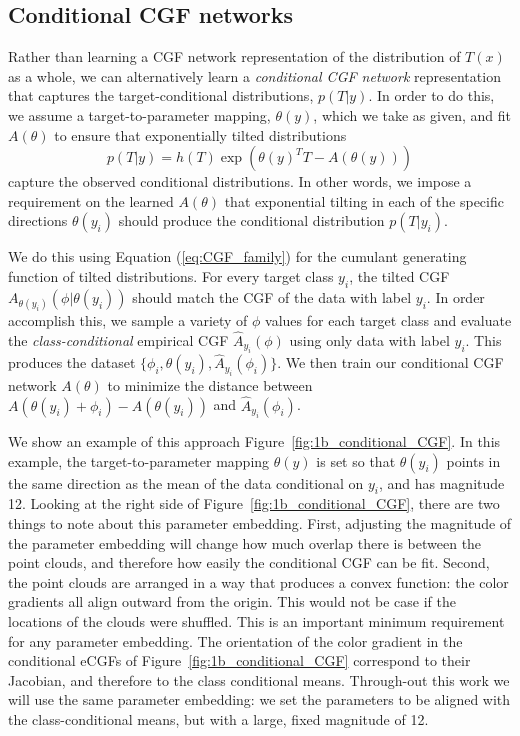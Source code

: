 \documentclass{article}      %
\begin{document}
\subsection{Conditional CGF networks}

Rather than learning a CGF network representation of the distribution of $T(x)$ as a whole, we can alternatively learn a \textit{conditional CGF network} representation that captures the target-conditional distributions, $p(T|y)$.
In order to do this, we assume a target-to-parameter mapping, $\theta(y)$, which we take as given, and fit $A(\theta)$ to ensure that exponentially tilted distributions
\begin{equation}
  p(T|y) = h(T) \exp(\theta(y)^T T - A(\theta(y))) \label{eq:class_conditional}
\end{equation}
capture the observed conditional distributions.
In other words, we impose a requirement on the learned $A(\theta)$ that exponential tilting in each of the specific directions $\theta(y_i)$ should produce the conditional distribution $p(T|y_i)$.

We do this using Equation (\ref{eq:CGF_family}) for the cumulant generating function of tilted distributions.
For every target class $y_i$, the tilted CGF $A_{\theta(y_i)}(\phi | \theta(y_i))$ should match the CGF of the data with label $y_i$.
In order accomplish this, we sample a variety of $\phi$ values for each target class and evaluate the \textit{class-conditional} empirical CGF $\hat A_{y_i}(\phi)$ using only data with label $y_i$.
This produces the dataset $\{\phi_{i}, \theta(y_i), \hat A_{y_i}(\phi_i)\}$.
We then train our conditional CGF network $A(\theta)$ to minimize the distance between ${A(\theta(y_i) + \phi_i ) - A(\theta(y_i))}$ and $\hat A_{y_i}(\phi_i)$.

We show an example of this approach Figure~\ref{fig:1b_conditional_CGF}.
In this example, the target-to-parameter mapping $\theta(y)$ is set so that $\theta(y_i)$ points in the same direction as the mean of the data conditional on $y_i$, and has magnitude 12.
Looking at the right side of Figure~\ref{fig:1b_conditional_CGF}, there are two things to note about this parameter embedding.
First, adjusting the magnitude of the parameter embedding will change how much overlap there is between the point clouds, and therefore how easily the conditional CGF can be fit. 
Second, the point clouds are arranged in a way that produces a convex function: the color gradients all align outward from the origin. 
This would not be case if the locations of the clouds were shuffled. 
This is an important minimum requirement for any parameter embedding.
The orientation of the color gradient in the conditional eCGFs of Figure~\ref{fig:1b_conditional_CGF} correspond to their Jacobian, and therefore to the class conditional means.
Through-out this work we will use the same parameter embedding: we set the parameters to be aligned with the class-conditional means, but with a large, fixed magnitude of 12.
\end{document}
